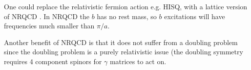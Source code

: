 One could replace the relativistic fermion action e.g. HISQ, with a lattice version of NRQCD \cite{Lepage:1992tx}. In NRQCD the $b$ has no rest mass, so $b$ excitations will have frequencies much smaller than $\pi/a$.



    Another benefit of NRQCD is that it does not suffer from a doubling problem since the doubling problem is a purely relativistic issue (the doubling symmetry requires 4 component spinors for $\gamma$ matrices to act on.

